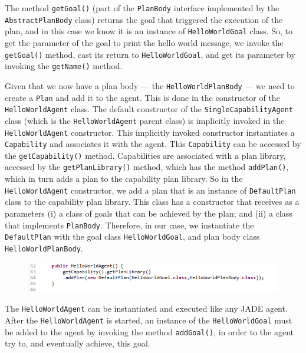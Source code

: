 \documentclass{article}
\begin{document}
The method \texttt{getGoal()} (part of the \texttt{PlanBody} interface implemented by the \texttt{AbstractPlanBody} class) returns the goal that triggered the execution of the plan, and in this case we know it is an instance of \texttt{HelloWorldGoal} class. So, to get the parameter of the goal to print the hello world message, we invoke the \texttt{getGoal()} method, cast its return to \texttt{HelloWorldGoal}, and get its parameter by invoking the \texttt{getName()} method.

Given that we now have a plan body --- the \texttt{HelloWorldPlanBody} --- we need to create a \texttt{Plan} and add it to the agent. This is done in the constructor of the \texttt{HelloWorldAgent} class. The default constructor of the  \texttt{SingleCapabilityAgent} class (which is the \texttt{HelloWorldAgent} parent class) is implicitly invoked in the \texttt{HelloWorldAgent} constructor. This implicitly invoked constructor instantiates a \texttt{Capability} and associates it with the agent. This \texttt{Capability} can be accessed by the \texttt{getCapability()} method. Capabilities are associated with a plan library, accessed by the \texttt{getPlanLibrary()} method, which has the method \texttt{addPlan()}, which in turn adds a plan to the capability plan library. So in the \texttt{HelloWorldAgent} constructor, we add a plan that is an instance of \texttt{DefaultPlan} class to the capability plan library. This class has a constructor that receives as a parameters (i) a class of goals that can be achieved by the plan; and (ii) a class that implements \texttt{PlanBody}. Therefore, in our case, we instantiate the \texttt{DefaultPlan} with the goal class \texttt{HelloWorldGoal}, and plan body class \texttt{HelloWorldPlanBody}.

\begin{figure}[!h]
\centering
\includegraphics[width=\linewidth]{helloConstr}
\label{fig:helloConstr}
\end{figure}

The \texttt{HelloWorldAgent} can be instantiated and executed like any JADE agent. After the \texttt{HelloWorldAgent} is started, an instance of the \texttt{HelloWorldGoal} must be added to the agent by invoking the method \texttt{addGoal()}, in order to the agent try to, and eventually achieve, this goal.
\end{document}
